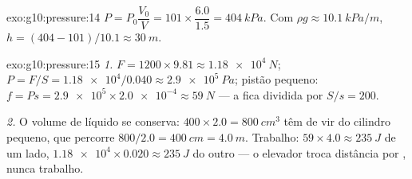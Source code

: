 \begin{solution}{exo:g10:pressure:14}
$P = P_0 \dfrac{V_0}{V} = 101 \times \dfrac{6.0}{1.5} = \qty{404}{kPa}$.
Com $\rho g \approx \qty{10.1}{kPa/m}$,
$h = (404 - 101)/10.1 \approx \qty{30}{m}$.
\end{solution}

\begin{solution}{exo:g10:pressure:15}
\emph{1.}  $F = 1200 \times 9.81 \approx \qty{1.18e4}{N}$; 
$P = F/S = \num{1.18e4}/0.040 \approx \qty{2.9e5}{Pa}$; pistão pequeno:
$f = P s = \num{2.9e5} \times \num{2.0e-4} \approx \qty{59}{N}$ --- a
 fica dividida por $S/s = 200$.

\emph{2.} O volume de líquido se conserva:
$400 \times 2.0 = \qty{800}{cm^3}$ têm de vir do cilindro pequeno, que
percorre $800/2.0 = \qty{400}{cm} = \qty{4.0}{m}$. Trabalho:
$59 \times 4.0 \approx \qty{235}{J}$ de um lado,
$\num{1.18e4} \times 0.020 \approx \qty{235}{J}$ do outro --- o elevador
troca distância por , nunca trabalho.
\end{solution}

